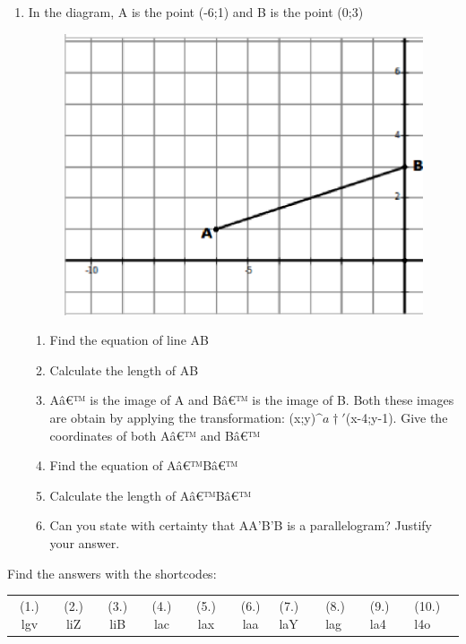 \begin{enumerate}[noitemsep, label=\textbf{\arabic*}. ]
\item In the diagram, A is the point (-6;1) and B is the point (0;3)
    \setcounter{subfigure}{0}
	\begin{figure}[H] %
    \begin{center}
    \label{m39167*id740344!!!underscore!!!media}\label{m39167*id740344!!!underscore!!!printimage}\includegraphics[width=0.4\columnwidth]{col11306.imgs/m39167_MG10C14_5.png} %
      \vspace{2pt}
    \vspace{.1in}
    \end{center}
 \end{figure}       \label{m39167*id982373}\begin{enumerate}[noitemsep, label=\textbf{\alph*}. ] 
            \item Find the equation of line AB \item Calculate the length of AB\item  A\^{a}€™ is the image of A and B\^{a}€™ is the image of B. Both these images are obtain by applying the transformation: (x;y)$\^{a}†'$(x-4;y-1). Give the coordinates of both A\^{a}€™ and B\^{a}€™\item Find the equation of A\^{a}€™B\^{a}€™\item Calculate the length of A\^{a}€™B\^{a}€™\item Can you state with certainty that AA'B'B is a parallelogram? Justify your answer.\end{enumerate}
                 \end{enumerate}
\label{m39167**end}
  \label{71522cd1c95e0cbedb9f300409036b1b**end}
\par {} Find the answers with the shortcodes:
 \par \begin{tabular}[h]{cccccc}
 (1.) lgv  &  (2.) liZ  &  (3.) liB  &  (4.) lac  &  (5.) lax  &  (6.) laa  &  (7.) laY  &  (8.) lag  &  (9.) la4  &  (10.) l4o  & \end{tabular}
